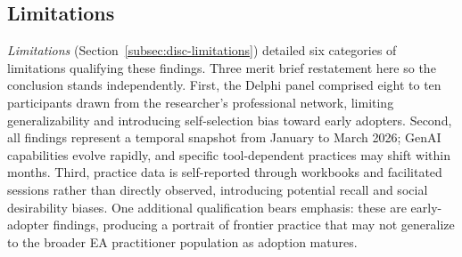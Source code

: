\subsection{Limitations}\label{subsec:concl-limitations}

\textit{Limitations} (Section~\ref{subsec:disc-limitations}) detailed six categories of limitations
qualifying these findings. Three merit brief restatement here so the conclusion
stands independently. First, the Delphi panel comprised eight to ten
participants drawn from the researcher's professional network, limiting generalizability and introducing self-selection bias toward early
adopters. Second, all findings represent a temporal snapshot from January to
March 2026; GenAI capabilities evolve rapidly, and specific tool-dependent
practices may shift within months. Third, practice data is self-reported through
workbooks and facilitated sessions rather than directly observed, introducing
potential recall and social desirability biases. One additional qualification
bears emphasis: these are early-adopter findings, producing a portrait of
frontier practice that may not generalize to the broader EA practitioner
population as adoption matures.

